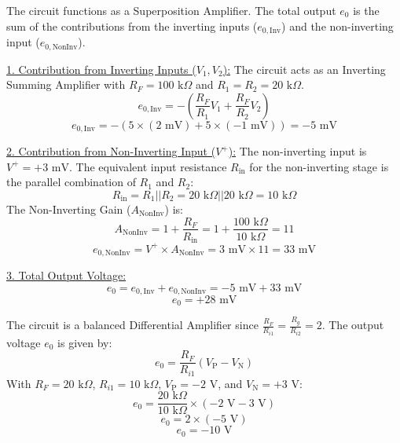 \begin{solutionblock}

The circuit functions as a Superposition Amplifier. The total output $e_0$ is the sum of the contributions from the inverting inputs ($e_{0, \text{Inv}}$) and the non-inverting input ($e_{0, \text{NonInv}}$).

\underline{1. Contribution from Inverting Inputs ($V_1, V_2$):}
The circuit acts as an Inverting Summing Amplifier with $R_F = 100 \text{ k}\Omega$ and $R_1 = R_2 = 20 \text{ k}\Omega$.
\[
e_{0, \text{Inv}} = - \left( \frac{R_F}{R_1} V_1 + \frac{R_F}{R_2} V_2 \right)
\]
\[
e_{0, \text{Inv}} = - \left( 5 \times (2 \text{ mV}) + 5 \times (-1 \text{ mV}) \right) = -5 \text{ mV}
\]

\underline{2. Contribution from Non-Inverting Input ($V^+$):}
The non-inverting input is $V^+ = +3 \text{ mV}$. The equivalent input resistance $R_{\text{in}}$ for the non-inverting stage is the parallel combination of $R_1$ and $R_2$:
\[
R_{\text{in}} = R_1 || R_2 = 20 \text{ k}\Omega || 20 \text{ k}\Omega = 10 \text{ k}\Omega
\]
The Non-Inverting Gain ($A_{\text{NonInv}}$) is:
\[
A_{\text{NonInv}} = 1 + \frac{R_F}{R_{\text{in}}} = 1 + \frac{100 \text{ k}\Omega}{10 \text{ k}\Omega} = 11
\]
\[
e_{0, \text{NonInv}} = V^+ \times A_{\text{NonInv}} = 3 \text{ mV} \times 11 = 33 \text{ mV}
\]

\underline{3. Total Output Voltage:}
\[
e_0 = e_{0, \text{Inv}} + e_{0, \text{NonInv}} = -5 \text{ mV} + 33 \text{ mV}
\]
\[
e_0 = +28 \text{ mV}
\]

\end{solutionblock}



\begin{solutionblock}
The circuit is a balanced Differential Amplifier since $\frac{R_F}{R_{i1}} = \frac{R_g}{R_{i2}} = 2$.
The output voltage $e_0$ is given by:
\[
e_0 = \frac{R_F}{R_{i1}} (V_{\text{P}} - V_{\text{N}})
\]
With $R_F = 20 \text{ k}\Omega$, $R_{i1} = 10 \text{ k}\Omega$, $V_{\text{P}} = -2 \text{ V}$, and $V_{\text{N}} = +3 \text{ V}$:
\[
e_0 = \frac{20 \text{ k}\Omega}{10 \text{ k}\Omega} \times (-2 \text{ V} - 3 \text{ V})
\]
\[
e_0 = 2 \times (-5 \text{ V})
\]
\[
e_0 = -10 \text{ V}
\]
\end{solutionblock}




